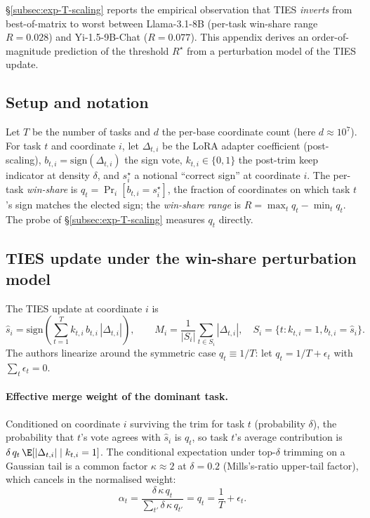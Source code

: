 \S\ref{subsec:exp-T-scaling} reports the empirical observation that
TIES \emph{inverts} from best-of-matrix to worst between
Llama-3.1-8B (per-task win-share range $R = 0.028$) and Yi-1.5-9B-Chat
($R = 0.077$). This appendix derives an order-of-magnitude prediction
of the threshold $R^\star$ from a perturbation model of the TIES
update.

\subsection{Setup and notation}
\label{app:td2-setup}

Let $T$ be the number of tasks and $d$ the per-base coordinate count
(here $d \approx 10^7$). For task $t$ and coordinate $i$, let
$\Delta_{t,i}$ be the LoRA adapter coefficient (post-scaling),
$b_{t,i} = \mathrm{sign}(\Delta_{t,i})$ the sign vote, $k_{t,i} \in
\{0,1\}$ the post-trim keep indicator at density $\delta$, and
$s_i^\star$ a notional ``correct sign'' at coordinate $i$. The
per-task \emph{win-share} is $q_t = \Pr_i[b_{t,i} = s_i^\star]$, the
fraction of coordinates on which task $t$'s sign matches the elected
sign; the \emph{win-share range} is $R = \max_t q_t - \min_t q_t$. The
probe of \S\ref{subsec:exp-T-scaling} measures $q_t$ directly.

\subsection{TIES update under the win-share perturbation model}

The TIES update at coordinate $i$ is
\begin{equation}
  \hat{s}_i
  =
  \mathrm{sign}\!\left(
    \sum_{t=1}^{T} k_{t,i}\, b_{t,i}\, |\Delta_{t,i}|
  \right),
  \qquad
  M_i
  =
  \frac{1}{|S_i|} \sum_{t \in S_i}\!|\Delta_{t,i}|,
  \quad
  S_i = \{t : k_{t,i} = 1, b_{t,i} = \hat{s}_i\}.
  \label{eq:ties-update}
\end{equation}
The authors linearize around the symmetric case $q_t \equiv 1/T$: let
$q_t = 1/T + \epsilon_t$ with $\sum_t \epsilon_t = 0$.

\paragraph{Effective merge weight of the dominant task.} Conditioned
on coordinate $i$ surviving the trim for task $t$ (probability
$\delta$), the probability that $t$'s vote agrees with $\hat{s}_i$ is
$q_t$, so task $t$'s average contribution is $\delta\, q_t\,
\E[|\Delta_{t,i}| \mid k_{t,i} = 1]$. The conditional expectation under
top-$\delta$ trimming on a Gaussian tail is a common factor
$\kappa \approx 2$ at $\delta = 0.2$ (Mills's-ratio upper-tail
factor), which cancels in the normalised weight:
\begin{equation}
  \alpha_t
  =
  \frac{\delta\,\kappa\,q_t}{\sum_{t'} \delta\,\kappa\,q_{t'}}
  = q_t = \frac{1}{T} + \epsilon_t.
  \label{eq:alpha-weight}
\end{equation}

